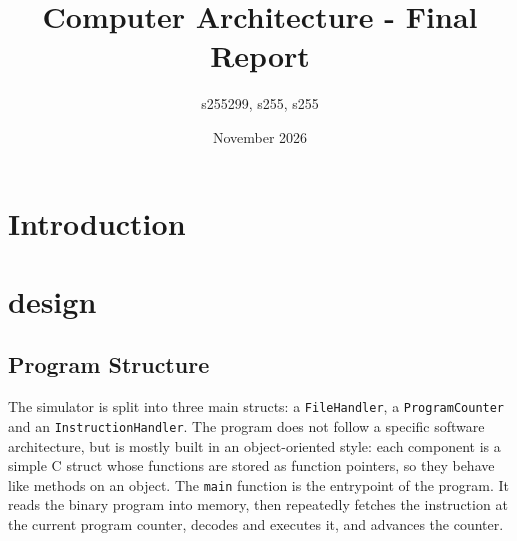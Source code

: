 \documentclass{article}
\title{Computer Architecture - Final Report}
\author{s255299, s255, s255}
\date{November 2026}
\begin{document}
\maketitle

\section{Introduction}
\section{design}
\subsection{Program Structure}
The simulator is split into three main structs: a \verb|FileHandler|,
a \verb|ProgramCounter| and an \verb|InstructionHandler|. The program does
not follow a specific software architecture, but is mostly built in an
object-oriented style: each component is a simple C struct whose functions are
stored as function pointers, so they behave like methods on an object.
The \verb|main| function is the entrypoint of the program. It reads the binary program
into memory, then repeatedly fetches the instruction at the current program
counter, decodes and executes it, and advances the counter.
\end{document}
